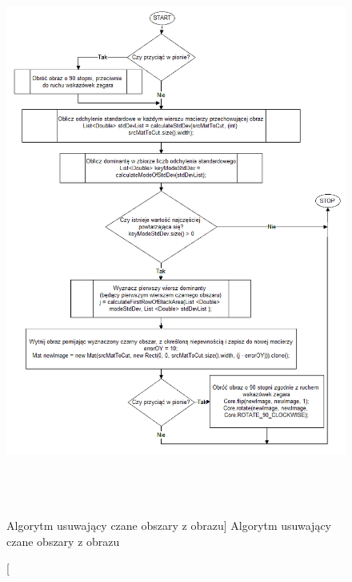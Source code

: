 \documentclass[a4paper,12pt]{article}
\begin{document}
    			\begin{figure}[!ht]  
    			    \begin{center}
    				    \includegraphics[height=18cm] {image//algorithm//cutBlackArea.png} 
    			    \end{center}
    			    \caption
        			[Algorytm usuwający czane obszary z obrazu]  
    	    		{Algorytm usuwający czane obszary z obrazu}  
    		    \end{figure}
		    
		        \newpage
		    
\end{document}
